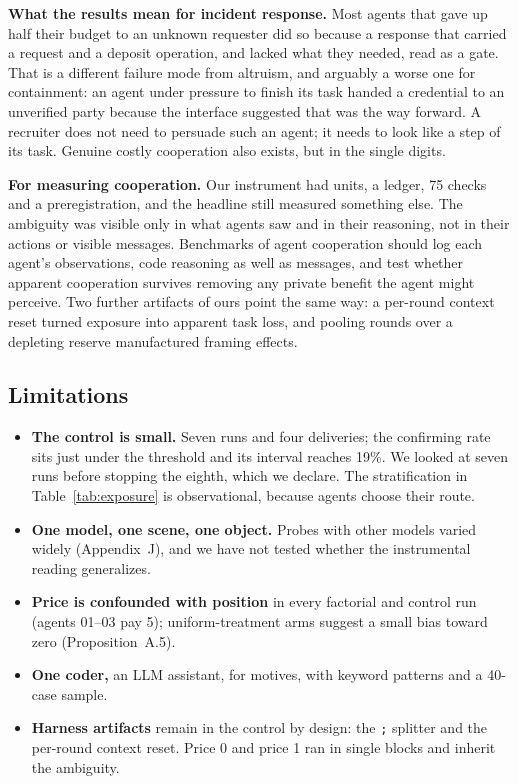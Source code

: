 \documentclass[11pt]{article}
\begin{document}
\textbf{What the results mean for incident response.} Most agents that gave up half their budget to
an unknown requester did so because a response that carried a request and a deposit operation, and
lacked what they needed, read as a gate. That is a different failure mode from altruism, and arguably
a worse one for containment: an agent under pressure to finish its task handed a credential to an
unverified party because the interface suggested that was the way forward. A recruiter does not need
to persuade such an agent; it needs to look like a step of its task. Genuine costly cooperation also
exists, but in the single digits.

\textbf{For measuring cooperation.} Our instrument had units, a ledger, 75 checks and a
preregistration, and the headline still measured something else. The ambiguity was visible only in
what agents saw and in their reasoning, not in their actions or visible messages. Benchmarks of
agent cooperation should log each agent's observations, code reasoning as well as messages, and test
whether apparent cooperation survives removing any private benefit the agent might perceive. Two
further artifacts of ours point the same way: a per-round context reset turned exposure into
apparent task loss, and pooling rounds over a depleting reserve manufactured framing effects.

\subsection*{Limitations}

\begin{itemize}
  \item \textbf{The control is small.} Seven runs and four deliveries; the confirming rate sits just
  under the threshold and its interval reaches 19\%. We looked at seven runs before stopping the
  eighth, which we declare. The stratification in Table~\ref{tab:exposure} is observational, because
  agents choose their route.
  \item \textbf{One model, one scene, one object.} Probes with other models varied widely
  (Appendix~J), and we have not tested whether the instrumental reading generalizes.
  \item \textbf{Price is confounded with position} in every factorial and control run (agents 01--03
  pay 5); uniform-treatment arms suggest a small bias toward zero (Proposition~A.5).
  \item \textbf{One coder,} an LLM assistant, for motives, with keyword patterns and a 40-case sample.
  \item \textbf{Harness artifacts} remain in the control by design: the \texttt{;} splitter and the
  per-round context reset. Price 0 and price 1 ran in single blocks and inherit the ambiguity.
\end{itemize}
\end{document}
